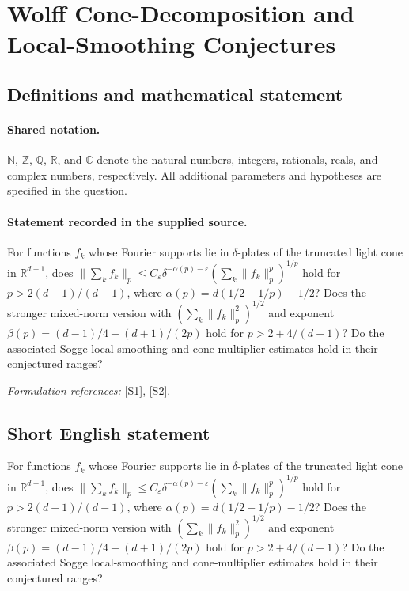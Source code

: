 \documentclass[11pt]{article}
\newcommand{\sref}[2]{\hyperlink{source:#1:#2}{[S#2]}}
\begin{document}
\section{Wolff Cone-Decomposition and Local-Smoothing Conjectures}\label{statement}

\subsection{Definitions and mathematical statement}

\paragraph{Shared notation.}$\mathbb N$, $\mathbb Z$, $\mathbb Q$, $\mathbb R$, and $\mathbb C$ denote the natural numbers, integers, rationals, reals, and complex numbers, respectively. All additional parameters and hypotheses are specified in the question.


\paragraph{Statement recorded in the supplied source.}
For functions $f_k$ whose Fourier supports lie in $\delta$-plates of the truncated light cone in $\mathbb{R}^{d+1}$, does $\lVert\sum_k f_k\rVert_p\leq C_\varepsilon\delta^{-\alpha(p)-\varepsilon}(\sum_k\lVert f_k\rVert_p^p)^{1/p}$ hold for $p>2(d+1)/(d-1)$, where $\alpha(p)=d(1/2-1/p)-1/2$? Does the stronger mixed-norm version with $(\sum_k\lVert f_k\rVert_p^2)^{1/2}$ and exponent $\beta(p)=(d-1)/4-(d+1)/(2p)$ hold for $p>2+4/(d-1)$? Do the associated Sogge local-smoothing and cone-multiplier estimates hold in their conjectured ranges?
\par\smallskip\textit{Formulation references:} \sref{statement}{1}, \sref{statement}{2}.
\subsection{Short English statement}
For functions $f_k$ whose Fourier supports lie in $\delta$-plates of the truncated light cone in $\mathbb{R}^{d+1}$, does $\lVert\sum_k f_k\rVert_p\leq C_\varepsilon\delta^{-\alpha(p)-\varepsilon}(\sum_k\lVert f_k\rVert_p^p)^{1/p}$ hold for $p>2(d+1)/(d-1)$, where $\alpha(p)=d(1/2-1/p)-1/2$? Does the stronger mixed-norm version with $(\sum_k\lVert f_k\rVert_p^2)^{1/2}$ and exponent $\beta(p)=(d-1)/4-(d+1)/(2p)$ hold for $p>2+4/(d-1)$? Do the associated Sogge local-smoothing and cone-multiplier estimates hold in their conjectured ranges?
\end{document}
